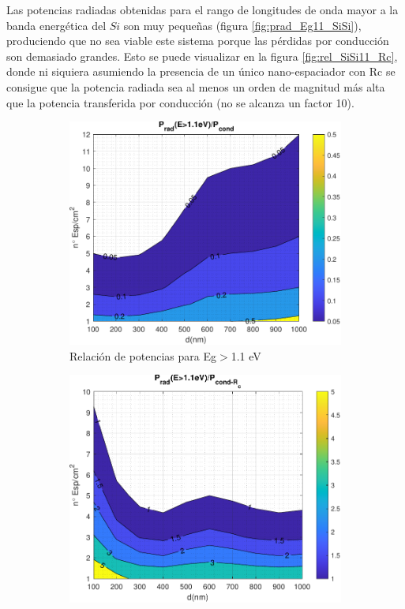 Las potencias radiadas obtenidas para el rango de longitudes de onda mayor a la banda energética del $Si$ son muy pequeñas (figura \ref{fig:prad_Eg11_SiSi}), produciendo que no sea viable este sistema porque las pérdidas por conducción son demasiado grandes. Esto se puede visualizar en la figura \ref{fig:rel_SiSi11_Rc}, donde ni siquiera asumiendo la presencia de un único nano-espaciador con Rc se consigue que la potencia radiada sea al menos un orden de magnitud más alta que la potencia transferida por conducción (no se alcanza un factor 10).
\begin{figure}[H]
	\centering
\begin{subfigure}[b]{0.49\textwidth}
	\centering
		\includegraphics[width=1.00\textwidth]{figuras/Resultados/RelacionCondRad/rel_SiSi11.pdf}
	\caption{Relación de potencias para Eg$>$1.1 eV}
	\label{fig:rel_SiSi11}
\end{subfigure}
\hfill
\begin{subfigure}[b]{0.49\textwidth}
	\centering
		\includegraphics[width=1.00\textwidth]{figuras/Resultados/RelacionCondRad/rel_SiSi11_Rc.pdf}

\end{subfigure}
\end{figure}
